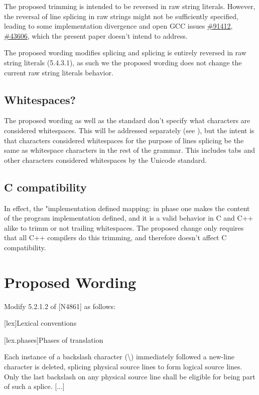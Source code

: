 \documentclass{wg21}
\begin{document}
The proposed trimming is intended to be reversed in raw string literals.
However, the reversal of line splicing in raw strings might not be sufficiently specified, leading to some implementation divergence
and open GCC issues \href{https://gcc.gnu.org/bugzilla/show_bug.cgi?id=91412}{\#91412}, \href{https://gcc.gnu.org/bugzilla/show_bug.cgi?id=43606}{\#43606},
which the present paper doesn't intend to address.

The proposed wording modifies splicing and splicing is entirely reversed in raw string literals (5.4.3.1), as such we the proposed wording does not change
the current raw string literals behavior.

\subsection{Whitespaces?}

The proposed wording as well as the standard don't specify what characters are considered whitespaces.
This will be addressed separately (see ), but the intent is that characters considered whitespaces for the purpose of lines splicing be the same
as whitespace characters in the rest of the grammar. This includes tabs and other characters considered whitespaces by the Unicode standard. 


\subsection{C compatibility}

In effect, the "implementation defined mapping: in phase one makes the content of the program implementation defined,
and it is a valid behavior in C and C++ alike to trimm or not trailing whitespaces.
The proposed change only requires that all C++ compilers do this trimming, and therefore doesn't affect C compatibility. 

\section{Proposed Wording}

Modify 5.2.1.2 of [N4861] as follows:

[lex]{Lexical conventions}



[lex.phases]{Phases of translation}%

Each instance of a backslash character (\textbackslash)
immediately followed  a new-line character is deleted, splicing
physical source lines to form logical source lines. Only the last
backslash on any physical source line shall be eligible for being part
of such a splice. [...]
\end{document}
